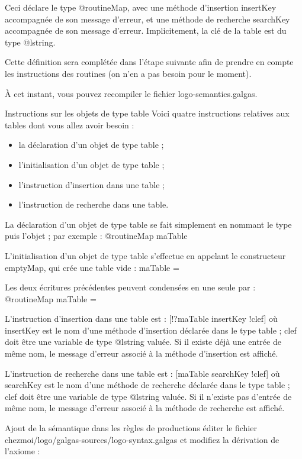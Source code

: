 Ceci déclare le type @routineMap, avec une méthode d'insertion insertKey accompagnée de son message d'erreur, et une méthode de recherche searchKey accompagnée de son message d'erreur. Implicitement, la clé de la table est du type @lstring.

Cette définition sera complétée dans l'étape suivante afin de prendre en compte les instructions des routines (on n'en a pas besoin pour le moment).

À cet instant, vous pouvez recompiler le fichier logo-semantics.galgas.

Instructions sur les objets de type table
Voici quatre instructions relatives aux tables dont vous allez avoir besoin :
\begin{itemize}
  \item la déclaration d'un objet de type table ;
  \item l'initialisation d'un objet de type table ;
  \item l'instruction d'insertion dans une table ;
  \item l'instruction de recherche dans une table.
\end{itemize}

La déclaration d'un objet de type table se fait simplement en nommant le type puis l'objet ; par exemple :
	@routineMap maTable

L'initialisation d'un objet de type table s'effectue en appelant le constructeur emptyMap, qui crée une table vide :
	maTable = {}

Les deux écritures précédentes peuvent condensées en une seule par :
	@routineMap maTable = {}

L'instruction d'insertion dans une table est :
	[!?maTable insertKey !clef]
où insertKey est le nom d'une méthode d'insertion déclarée dans le type table ; clef doit être une variable de type @lstring valuée. Si il existe déjà une entrée de même nom, le message d'erreur associé à la méthode d'insertion est affiché.

L'instruction de recherche dans une table est :
	[maTable searchKey !clef]
où searchKey est le nom d'une méthode de recherche déclarée dans le type table ; clef doit être une variable de type @lstring valuée. Si il n'existe pas d'entrée de même nom, le message d'erreur associé à la méthode de recherche est affiché.

Ajout de la sémantique dans les règles de productions
éditer le fichier chezmoi/logo/galgas-sources/logo-syntax.galgas et modifiez la dérivation de l'axiome :

